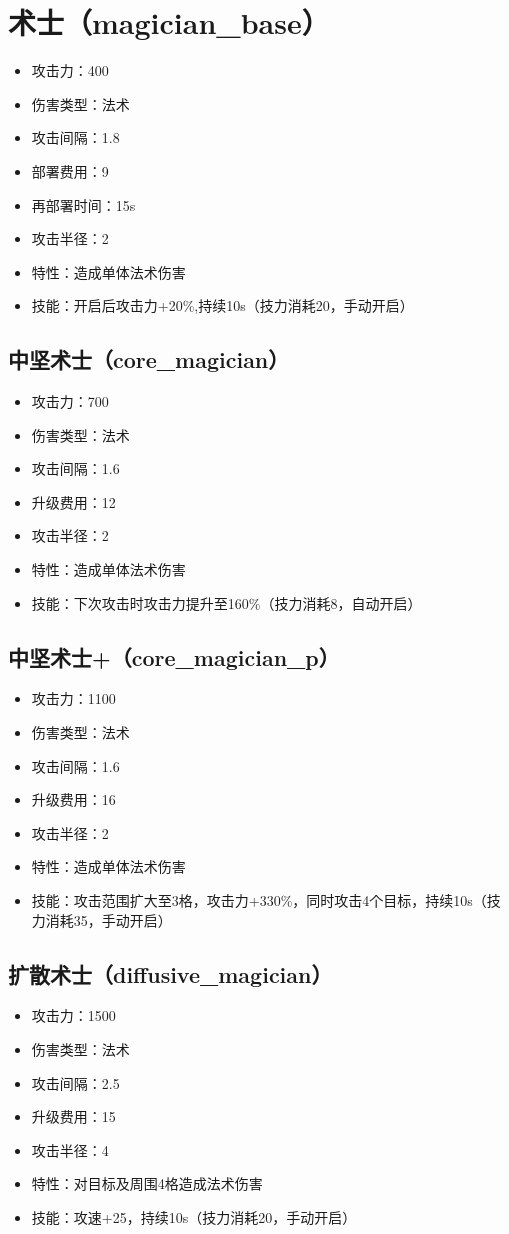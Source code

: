 \documentclass[a4paper,12pt]{article}
\begin{document}
	\section{术士（magician\_base）}
		\begin{itemize}
			\item 攻击力：400
			\item 伤害类型：法术
			\item 攻击间隔：1.8
			\item 部署费用：9
			\item 再部署时间：15s
			\item 攻击半径：2
			\item 特性：造成单体法术伤害
			\item 技能：开启后攻击力+20\%,持续10s（技力消耗20，手动开启）
		\end{itemize}
		\subsection{中坚术士（core\_magician）}
			\begin{itemize}
				\item 攻击力：700
				\item 伤害类型：法术
				\item 攻击间隔：1.6
				\item 升级费用：12
				\item 攻击半径：2
				\item 特性：造成单体法术伤害
				\item 技能：下次攻击时攻击力提升至160\%（技力消耗8，自动开启）
			\end{itemize}
		\subsection{中坚术士+（core\_magician\_p）}
			\begin{itemize}
				\item 攻击力：1100
				\item 伤害类型：法术
				\item 攻击间隔：1.6
				\item 升级费用：16
				\item 攻击半径：2
				\item 特性：造成单体法术伤害
				\item 技能：攻击范围扩大至3格，攻击力+330\%，同时攻击4个目标，持续10s（技力消耗35，手动开启）
			\end{itemize}
		\subsection{扩散术士（diffusive\_magician）}
			\begin{itemize}
				\item 攻击力：1500
				\item 伤害类型：法术
				\item 攻击间隔：2.5
				\item 升级费用：15
				\item 攻击半径：4
				\item 特性：对目标及周围4格造成法术伤害
				\item 技能：攻速+25，持续10s（技力消耗20，手动开启）
			\end{itemize}
\end{document}
